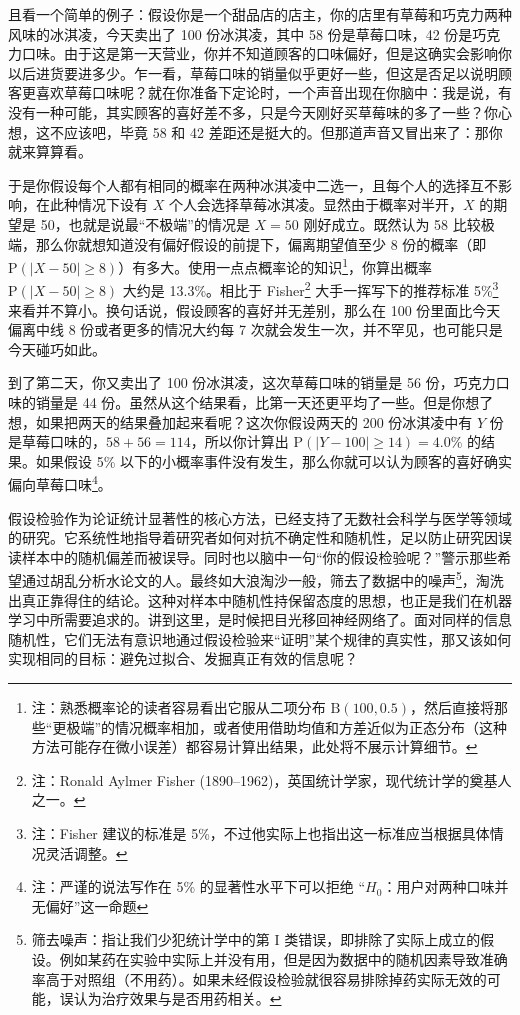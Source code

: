 且看一个简单的例子：假设你是一个甜品店的店主，你的店里有草莓和巧克力两种风味的冰淇凌，今天卖出了 100 份冰淇凌，其中 58 份是草莓口味，42 份是巧克力口味。由于这是第一天营业，你并不知道顾客的口味偏好，但是这确实会影响你以后进货要进多少。乍一看，草莓口味的销量似乎更好一些，但这是否足以说明顾客更喜欢草莓口味呢？就在你准备下定论时，一个声音出现在你脑中：我是说，有没有一种可能，其实顾客的喜好差不多，只是今天刚好买草莓味的多了一些？你心想，这不应该吧，毕竟 58 和 42 差距还是挺大的。但那道声音又冒出来了：那你就来算算看。

于是你假设每个人都有相同的概率在两种冰淇凌中二选一，且每个人的选择互不影响，在此种情况下设有 $X$ 个人会选择草莓冰淇凌。显然由于概率对半开，$X$ 的期望是 50，也就是说最“不极端”的情况是 $X=50$ 刚好成立。既然认为 58 比较极端，那么你就想知道没有偏好假设的前提下，偏离期望值至少 8 份的概率（即 $\mathrm{P}(|X - 50| \geq 8)$）有多大。使用一点点概率论的知识\footnote{注：熟悉概率论的读者容易看出它服从二项分布 $\mathrm{B}(100, 0.5)$，然后直接将那些“更极端”的情况概率相加，或者使用借助均值和方差近似为正态分布（这种方法可能存在微小误差）都容易计算出结果，此处将不展示计算细节。}，你算出概率 $\mathrm{P}(|X - 50| \geq 8)$ 大约是 13.3\%。相比于 Fisher\footnote{注：Ronald Aylmer Fisher (1890–1962)，英国统计学家，现代统计学的奠基人之一。} 大手一挥写下的推荐标准 5\%\footnote{注：Fisher 建议的标准是 5\%，不过他实际上也指出这一标准应当根据具体情况灵活调整。} 来看并不算小。换句话说，假设顾客的喜好并无差别，那么在 100 份里面比今天偏离中线 8 份或者更多的情况大约每 7 次就会发生一次，并不罕见，也可能只是今天碰巧如此。

到了第二天，你又卖出了 100 份冰淇凌，这次草莓口味的销量是 56 份，巧克力口味的销量是 44 份。虽然从这个结果看，比第一天还更平均了一些。但是你想了想，如果把两天的结果叠加起来看呢？这次你假设两天的 200 份冰淇凌中有 $Y$ 份是草莓口味的，$58+56=114$，所以你计算出 $\mathrm{P}(|Y-100|\ge 14) = 4.0\%$ 的结果。如果假设 5\% 以下的小概率事件没有发生，那么你就可以认为顾客的喜好确实偏向草莓口味\footnote{注：严谨的说法写作在 5\% 的显著性水平下可以拒绝 “$H_0$：用户对两种口味并无偏好”这一命题}。

假设检验作为论证统计显著性的核心方法，已经支持了无数社会科学与医学等领域的研究。它系统性地指导着研究者如何对抗不确定性和随机性，足以防止研究因误读样本中的随机偏差而被误导。同时也以脑中一句“你的假设检验呢？”警示那些希望通过胡乱分析水论文的人。最终如大浪淘沙一般，筛去了数据中的噪声\footnote{筛去噪声：指让我们少犯统计学中的第 I 类错误，即排除了实际上成立的假设。例如某药在实验中实际上并没有用，但是因为数据中的随机因素导致准确率高于对照组（不用药）。如果未经假设检验就很容易排除掉药实际无效的可能，误认为治疗效果与是否用药相关。}，淘洗出真正靠得住的结论。这种对样本中随机性持保留态度的思想，也正是我们在机器学习中所需要追求的。讲到这里，是时候把目光移回神经网络了。面对同样的信息随机性，它们无法有意识地通过假设检验来“证明”某个规律的真实性，那又该如何实现相同的目标：避免过拟合、发掘真正有效的信息呢？

